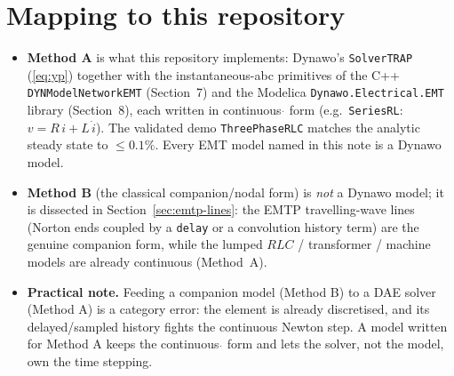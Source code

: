 \documentclass[11pt]{article}
\begin{document}
\section{Mapping to this repository}

\begin{itemize}
\item \textbf{Method A} is what this repository implements: Dynawo's
\texttt{SolverTRAP} (\eqref{eq:yp}) together with the instantaneous-abc
primitives of the C++ \texttt{DYNModelNetworkEMT} (Section~7) and the Modelica
\texttt{Dynawo.Electrical.EMT} library (Section~8), each written in continuous
$\dot{}$ form (e.g.\ \texttt{SeriesRL}: $v=R\,i+L\,\dot i$). The validated demo
\texttt{ThreePhaseRLC} matches the analytic steady state to $\le 0.1\%$. Every
EMT model named in this note is a Dynawo model.

\item \textbf{Method B} (the classical companion/nodal form) is \emph{not} a
Dynawo model; it is dissected in Section~\ref{sec:emtp-lines}: the EMTP
travelling-wave lines (Norton ends coupled by a \texttt{delay} or a convolution
history term) are the genuine companion form, while the lumped $RLC$ /
transformer / machine models are already continuous (Method~A).

\item \textbf{Practical note.} Feeding a companion model (Method B) to a DAE
solver (Method A) is a category error: the element is already discretised, and
its delayed/sampled history fights the continuous Newton step. A model written
for Method A keeps the continuous $\dot{}$ form and lets the solver, not the
model, own the time stepping.
\end{itemize}
\end{document}

